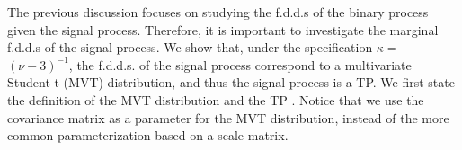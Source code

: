 

The previous discussion focuses on studying the f.d.d.s of the binary process 
given the signal process. Therefore, it is important to investigate 
the marginal f.d.d.s of the signal process. We show that, under the specification 
$\kappa =$ $(\nu-3)^{-1}$, the f.d.d.s. of the signal process correspond to a 
multivariate Student-t (MVT) distribution, and thus the signal process is a TP. 
We first state the definition of the MVT distribution and the TP
\citep[see, e.g.,][]{Shah2014}. Notice that we use the covariance matrix as a 
parameter for the MVT distribution, instead of the more common parameterization 
based on a scale matrix.

